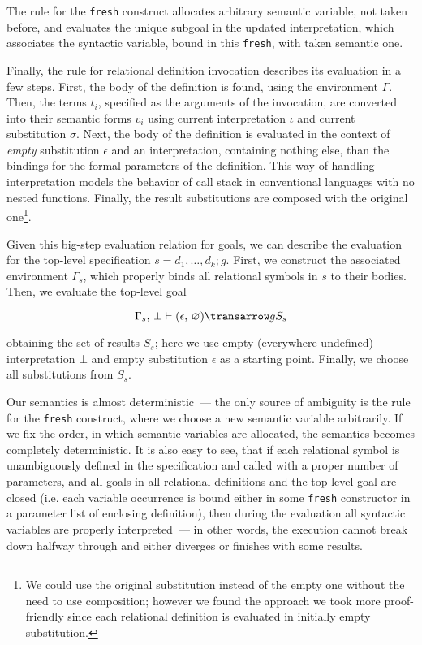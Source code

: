 The rule for the \lstinline|fresh| construct allocates arbitrary semantic variable, not taken before, and evaluates the unique subgoal in the updated interpretation, which
associates the syntactic variable, bound in this \lstinline|fresh|, with taken semantic one.

Finally, the rule for relational definition invocation describes its evaluation in a few steps. First, the body of the definition is found, using the environment $\Gamma$. 
Then, the terms $t_i$, specified as the arguments of the invocation, are converted into their semantic forms $v_i$ using current interpretation $\iota$ and current 
substitution $\sigma$. Next, the body of the definition is evaluated in the context of \emph{empty} substitution $\epsilon$ and an interpretation, containing nothing
else, than the bindings for the formal parameters of the definition. This way of handling interpretation models the behavior of call stack in conventional languages
with no nested functions. Finally, the result substitutions are composed with the original one\footnote{We could use the original
substitution instead of the empty one without the need to use composition; however we found the approach we took more proof-friendly since each relational definition is evaluated
in initially empty substitution.}. 

Given this big-step evaluation relation for goals, we can describe the evaluation for the top-level specification $s=d_1,\dots,d_k;g$. First, we construct the associated environment
$\Gamma_s$, which properly binds all relational symbols in $s$ to their bodies. Then, we evaluate the top-level goal

$$
\otrans{\Gamma_s,\,\bot}{(\epsilon,\,\emptyset)}{g}{S_s}
$$

\noindent obtaining the set of results $S_s$; here we use empty (everywhere undefined) interpretation $\bot$ and empty substitution $\epsilon$ as a starting point. 
Finally, we choose all substitutions from $S_s$. 

Our semantics is almost deterministic~--- the only source of ambiguity is the rule for the \lstinline|fresh| construct, where we choose a new semantic variable
arbitrarily. If we fix the order, in which semantic variables are allocated, the semantics becomes completely deterministic. It is also easy to see, that if each
relational symbol is unambiguously defined in the specification and called with a proper number of parameters, and all goals in all relational definitions and the 
top-level goal are closed (i.e. each variable occurrence is bound either in some \lstinline|fresh| constructor in a parameter list of enclosing definition), 
then during the evaluation all syntactic variables are properly interpreted~--- in other words, the execution cannot break down halfway through and either diverges or 
finishes with some results.

